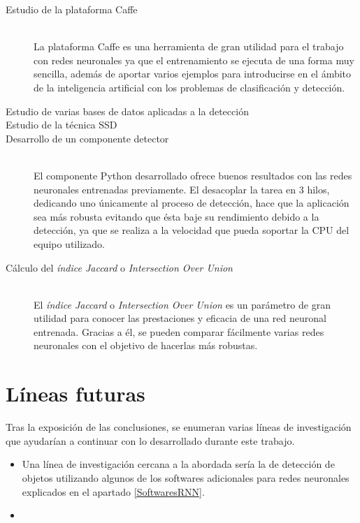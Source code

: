 \documentclass[a4paper, 12pt, oneside]{book}
\begin{document}
\begin{description}
\item[Estudio de la plataforma Caffe]\hfill 
\vspace{5pt}
\\
La plataforma Caffe es una herramienta de gran utilidad para el trabajo con redes neuronales ya que el entrenamiento se ejecuta de una forma muy sencilla, además de aportar varios ejemplos para introducirse en el ámbito de la inteligencia artificial con los problemas de clasificación y detección. 
\item[Estudio de varias bases de datos aplicadas a la detección]
\item[Estudio de la técnica SSD]
\item[Desarrollo de un componente detector]\hfill 
\vspace{5pt}
\\
El componente Python desarrollado ofrece buenos resultados con las redes neuronales entrenadas previamente. El desacoplar la tarea en 3 hilos, dedicando uno únicamente al proceso de detección, hace que la aplicación sea más robusta evitando que ésta baje su rendimiento debido a la detección, ya que se realiza a la velocidad que pueda soportar la CPU del equipo utilizado.
\item[Cálculo del \textit{índice Jaccard} o \textit{Intersection Over Union}]\hfill 
\vspace{5pt}
\\
El \textit{índice Jaccard} o \textit{Intersection Over Union} es un parámetro de gran utilidad para conocer las prestaciones y eficacia de una red neuronal entrenada. Gracias a él, se pueden comparar fácilmente varias redes neuronales con el objetivo de hacerlas más robustas.
\end{description}

\section{Líneas futuras}

Tras la exposición de las conclusiones, se enumeran varias líneas de investigación que ayudarían a continuar con lo desarrollado durante este trabajo.

\begin{itemize}
\item Una línea de investigación cercana a la abordada sería la de detección de objetos utilizando algunos de los softwares adicionales para redes neuronales explicados en el apartado \ref{SoftwaresRNN}.
\item
\end{itemize}
\end{document}
